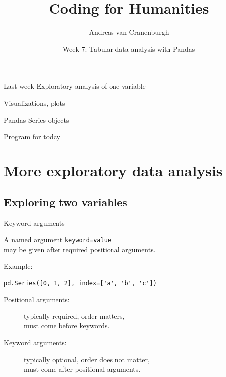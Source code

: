 \documentclass[aspectratio=169,usenames,dvipsnames]{beamer}
\title{Coding for Humanities}
\author{Andreas van Cranenburgh}
\date{Week 7: Tabular data analysis with Pandas}
\begin{document}
\maketitle


\begin{frame}{Last week}
    Exploratory analysis of one variable

    \vspace{1em}
    Visualizations, plots

    \vspace{1em}
    Pandas Series objects
\end{frame}

\begin{frame}{Program for today}
\tableofcontents
\end{frame}



\section{More exploratory data analysis}
\subsection{Exploring two variables}

\frame{\tableofcontents[currentsubsection]}
\begin{frame}[fragile]{Keyword arguments}
    \begin{definition}
        A named  argument \texttt{keyword=value} \\
        may be given after required positional arguments.
    \end{definition}

Example:
\begin{lstlisting}
pd.Series([0, 1, 2], index=['a', 'b', 'c'])
\end{lstlisting}
\pause

    \begin{description}
        \item[Positional arguments:]
            typically required, order matters, \\
            must come before keywords.
        \item[Keyword arguments:]
                typically optional, order does not matter,\\
                must come after positional arguments.
    \end{description}
\end{frame}
\end{document}
